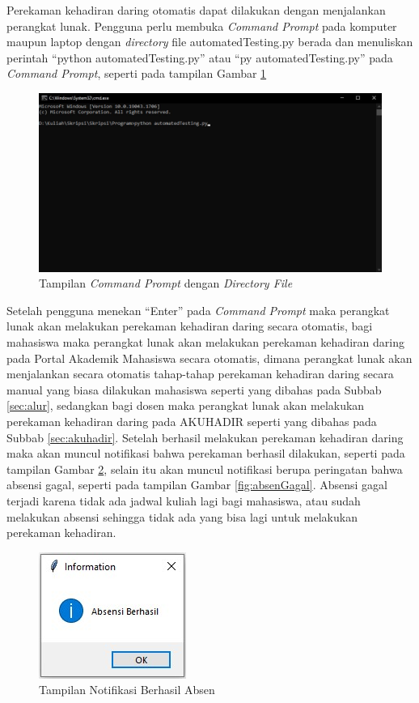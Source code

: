 Perekaman kehadiran daring otomatis dapat dilakukan dengan menjalankan perangkat lunak. Pengguna perlu membuka \textit{Command Prompt} pada komputer maupun laptop dengan \textit{directory} file automatedTesting.py berada dan menuliskan perintah ``python automatedTesting.py'' atau ``py automatedTesting.py'' pada \textit{Command Prompt}, seperti pada tampilan Gambar \ref{fig:cmd}
\begin{figure}[H]
	\centering
	\includegraphics[scale=0.5]{Gambar/cmd.jpg}
	\caption{Tampilan \textit{Command Prompt} dengan \textit{Directory File}} 
	\label{fig:cmd}
\end{figure}

Setelah pengguna menekan ``Enter'' pada \textit{Command Prompt} maka perangkat lunak akan melakukan perekaman kehadiran daring secara otomatis, bagi mahasiswa maka perangkat lunak akan melakukan perekaman kehadiran daring pada Portal Akademik Mahasiswa secara otomatis, dimana perangkat lunak akan menjalankan secara otomatis tahap-tahap perekaman kehadiran daring secara manual yang biasa dilakukan mahasiswa seperti yang dibahas pada Subbab \ref{sec:alur}, sedangkan bagi dosen maka perangkat lunak akan melakukan perekaman kehadiran daring pada AKUHADIR seperti yang dibahas pada Subbab \ref{sec:akuhadir}. Setelah berhasil melakukan perekaman kehadiran daring maka akan muncul notifikasi bahwa perekaman berhasil dilakukan, seperti pada tampilan Gambar \ref{fig:absenBerhasil}, selain itu akan muncul notifikasi berupa peringatan bahwa absensi gagal, seperti pada tampilan Gambar \ref{fig:absenGagal}. Absensi gagal terjadi karena tidak ada jadwal kuliah lagi bagi mahasiswa, atau sudah melakukan absensi sehingga tidak ada yang bisa lagi untuk melakukan perekaman kehadiran.
\begin{figure}[H]
	\centering
	\includegraphics[scale=0.7]{Gambar/infoBox.jpg}
	\caption{Tampilan Notifikasi Berhasil Absen} 
	\label{fig:absenBerhasil}
\end{figure}

